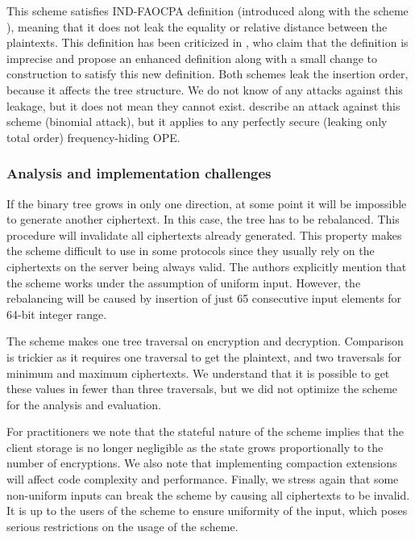 		This scheme satisfies IND-FAOCPA definition (introduced along with the scheme \cite{fh-ope}), meaning that it does not leak the equality or relative distance between the plaintexts.
		This definition has been criticized in \cite{florian-def-critique}, who claim that the definition is imprecise and propose an enhanced definition along with a small change to construction to satisfy this new definition.
		Both schemes leak the insertion order, because it affects the tree structure.
		We do not know of any attacks against this leakage, but it does not mean they cannot exist.
		\textcite{leakage-abuse-grubs-2017} describe an attack against this scheme (binomial attack), but it applies to any perfectly secure (leaking only total order) frequency-hiding OPE\@.

	\subsubsection{Analysis and implementation challenges}

		If the binary tree grows in only one direction, at some point it will be impossible to generate another ciphertext.
		In this case, the tree has to be rebalanced.
		This procedure will invalidate all ciphertexts already generated.
		This property makes the scheme difficult to use in some protocols since they usually rely on the ciphertexts on the server being always valid.
		The authors explicitly mention that the scheme works under the assumption of uniform input.
		However, the rebalancing will be caused by insertion of just 65 consecutive input elements for 64-bit integer range.

		The scheme makes one tree traversal on encryption and decryption.
		Comparison is trickier as it requires one traversal to get the plaintext, and two traversals for minimum and maximum ciphertexts.
		We understand that it is possible to get these values in fewer than three traversals, but we did not optimize the scheme for the analysis and evaluation.

		For practitioners we note that the stateful nature of the scheme implies that the client storage is no longer negligible as the state grows proportionally to the number of encryptions.
		We also note that implementing compaction extensions will affect code complexity and performance.
		Finally, we stress again that some non-uniform inputs can break the scheme by causing all ciphertexts to be invalid.
		It is up to the users of the scheme to ensure uniformity of the input, which poses serious restrictions on the usage of the scheme.
